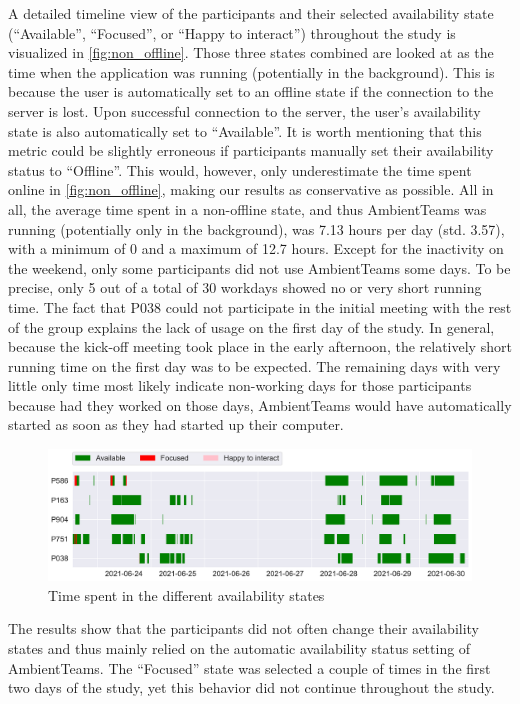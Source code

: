 A detailed timeline view of the participants and their selected availability state (\enquote{Available}, \enquote{Focused}, or \enquote{Happy to interact}) throughout the study is visualized in \autoref{fig:non_offline}. Those three states combined are looked at as the time when the application was running (potentially in the background). This is because the user is automatically set to an offline state if the connection to the server is lost. Upon successful connection to the server, the user's availability state is also automatically set to \enquote{Available}. It is worth mentioning that this metric could be slightly erroneous if participants manually set their availability status to \enquote{Offline}. This would, however, only underestimate the time spent online in \autoref{fig:non_offline}, making our results as conservative as possible. All in all, the average time spent in a non-offline state, and thus AmbientTeams was running (potentially only in the background), was 7.13 hours per day (std. 3.57), with a minimum of 0 and a maximum of 12.7 hours. Except for the inactivity on the weekend, only some participants did not use AmbientTeams some days. To be precise, only 5 out of a total of 30 workdays showed no or very short running time. The fact that P038 could not participate in the initial meeting with the rest of the group explains the lack of usage on the first day of the study. In general, because the kick-off meeting took place in the early afternoon, the relatively short running time on the first day was to be expected. The remaining days with very little only time most likely indicate non-working days for those participants because had they worked on those days, AmbientTeams would have automatically started as soon as they had started up their computer.

\begin{figure}[h]
    \centering
    \includegraphics[width=\linewidth]{plots/non_offline.pdf}
    \caption{Time spent in the different availability states}
    \label{fig:non_offline}
\end{figure}

The results show that the participants did not often change their availability states and thus mainly relied on the automatic availability status setting of AmbientTeams. The \enquote{Focused} state was selected a couple of times in the first two days of the study, yet this behavior did not continue throughout the study.

